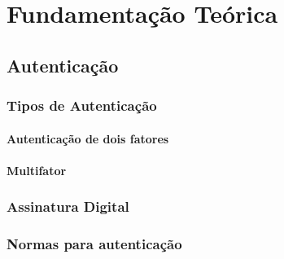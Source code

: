 \chapter{Fundamentação Teórica}
\section{Autenticação}
\subsection{Tipos de Autenticação}
\subsubsection{Autenticação de dois fatores}
\subsubsection{Multifator}
\subsection{Assinatura Digital}
\subsection{Normas para autenticação}

